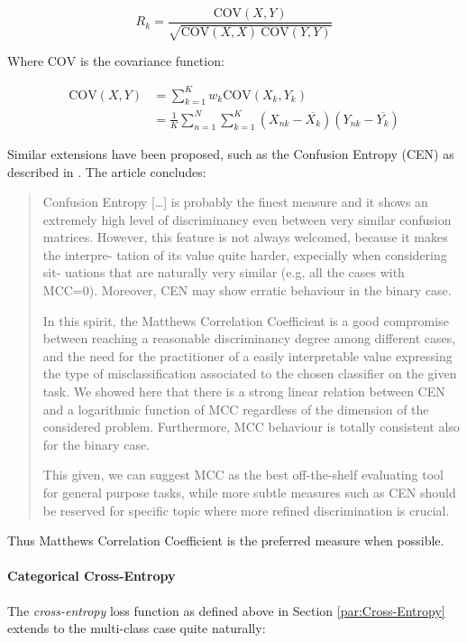 \begin{equation}
  R_k  = \frac{\text{COV}(X, Y)}{\sqrt{\text{COV}(X, X) \ \text{COV}(Y, Y)}}
\end{equation}

Where $\text{COV}$ is the covariance function:

\begin{align}
  \text{COV}(X, Y) &= \sum_{k=1}^K w_k \text{COV}(X_k, Y_k) \\
  &= \frac{1}{K} \sum_{n=1}^N \sum_{k=1}^K (X_{nk} - \overline{X_k})(Y_{nk} - \overline{Y_k})
\end{align}

Similar extensions have been proposed, such as the Confusion Entropy (CEN) as described in \cite{Jurman:2012aa}. The article concludes:

\blockquote{Confusion Entropy [\ldots] is probably the finest measure and it shows an extremely high level of discriminancy even between very similar confusion matrices. However, this feature is not always welcomed, because it makes the interpre- tation of its value quite harder, expecially when considering sit- uations that are naturally very similar (e.g, all the cases with MCC=0). Moreover, CEN may show erratic behaviour in the binary case.

In this spirit, the Matthews Correlation Coefficient is a good compromise between reaching a reasonable discriminancy degree among different cases, and the need for the practitioner of a easily interpretable value expressing the type of misclassification associated to the chosen classifier on the given task. We showed here that there is a strong linear relation between CEN and a logarithmic function of MCC regardless of the dimension of the considered problem. Furthermore, MCC behaviour is totally consistent also for the binary case.

This given, we can suggest MCC as the best off-the-shelf evaluating tool for general purpose tasks, while more subtle measures such as CEN should be reserved for specific topic where more refined discrimination is crucial.}

Thus Matthews Correlation Coefficient is the preferred measure when possible.

\paragraph{Categorical Cross-Entropy}
\label{par:Categorical Cross-Entropy}

The \emph{cross-entropy} loss function as defined above in Section \ref{par:Cross-Entropy} extends to the multi-class case quite naturally:

